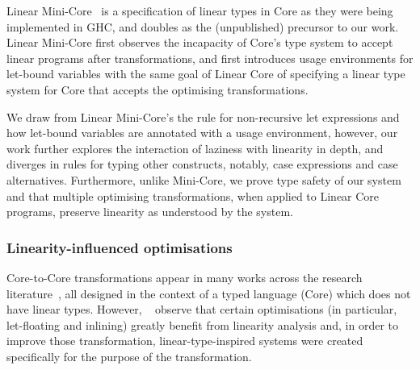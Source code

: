 \documentclass[acmsmall, screen, review]{acmart}
\begin{document}
Linear Mini-Core~\cite{cite:minicore} is a specification of linear types in
Core as they were being implemented in GHC, and doubles as the (unpublished)
precursor to our work. Linear Mini-Core first observes the incapacity of
Core's type system to accept linear programs after transformations, and first
introduces usage environments for let-bound variables with the same goal of
Linear Core of specifying a linear type system for Core that accepts the
optimising transformations.

We draw from Linear Mini-Core's the rule for non-recursive let expressions and
how let-bound variables are annotated with a usage environment, however, our
work further explores the interaction of laziness with linearity in depth, and
diverges in rules for typing other constructs, notably, case expressions and
case alternatives. Furthermore, unlike Mini-Core, we prove type safety of our
system and that multiple optimising transformations, when applied to Linear
Core programs, preserve linearity as understood by the system.

% 
% 

% 

\subsubsection{Linearity-influenced optimisations}

Core-to-Core transformations appear in many works across the research
literature~\cite{cite:let-floating,peytonjones1997a,santos1995compilation,peytonjones2002secrets,baker-finch2004constructed,maurer2017compiling,Breitner2016_1000054251,sergey_vytiniotis_jones_breitner_2017},
all designed in the context of a typed language (Core) which does not have
linear types. However,
~\cite{cite:let-floating,peytonjones1997a,cite:linearhaskell} observe that
certain optimisations (in particular, let-floating and inlining) greatly
benefit from linearity analysis and, in order to improve those transformation,
linear-type-inspired systems were created specifically for the purpose of the
transformation.
\end{document}
